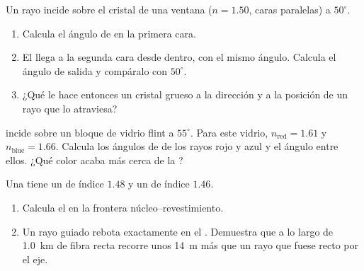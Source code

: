\begin{exercise}[$\star\star$]\label{exo:g10:refraction:9}
Un rayo incide sobre el cristal de una ventana ($n = 1.50$, caras
paralelas) a $50^\circ$.
\begin{enumerate}
  \item Calcula el ángulo de  en la primera cara.
  \item El  llega a la segunda cara desde dentro, con el
        mismo ángulo. Calcula el ángulo de salida y compáralo con
        $50^\circ$.
  \item ¿Qué le hace entonces un cristal grueso a la dirección y a la
        posición de un rayo que lo atraviesa?
\end{enumerate}
\end{exercise}

\begin{exercise}[$\star\star$]\label{exo:g10:refraction:10}
 incide sobre un bloque de vidrio flint a $55^\circ$. Para
este vidrio, $n_{\text{red}} = 1.61$ y $n_{\text{blue}} = 1.66$. Calcula
los ángulos de  de los rayos rojo y azul y el ángulo entre
ellos. ¿Qué color acaba más cerca de la ?
\end{exercise}

\begin{exercise}[$\star\star$]\label{exo:g10:refraction:11}
Una  tiene un  de índice $1.48$ y un  de
índice $1.46$.
\begin{enumerate}
  \item Calcula el  en la frontera núcleo--revestimiento.
  \item Un rayo guiado rebota exactamente en el . Demuestra
        que a lo largo de \qty{1.0}{km} de fibra recta recorre unos
        \qty{14}{m} más que un rayo que fuese recto por el eje.
\end{enumerate}
\end{exercise}

